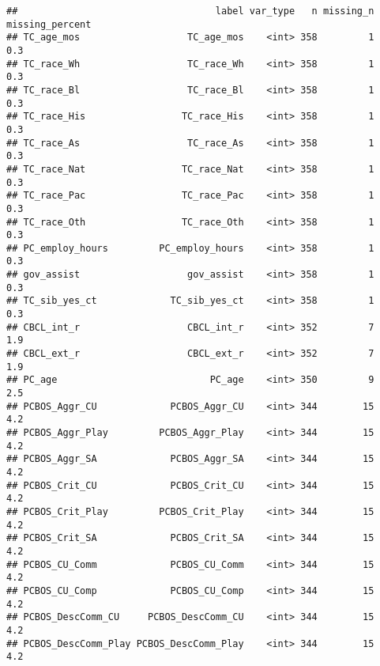 \documentclass[
]{article}
\newenvironment{Shaded}{\begin{snugshade}}{\end{snugshade}}
\newcommand{\FunctionTok}[1]{\textcolor[rgb]{0.00,0.00,0.00}{#1}}
\newcommand{\NormalTok}[1]{#1}
\newcommand{\OtherTok}[1]{\textcolor[rgb]{0.56,0.35,0.01}{#1}}
\newcommand{\SpecialCharTok}[1]{\textcolor[rgb]{0.00,0.00,0.00}{#1}}
\begin{document}
\begin{Shaded}
\end{Shaded}

\begin{verbatim}
##                                   label var_type   n missing_n missing_percent
## TC_age_mos                   TC_age_mos    <int> 358         1             0.3
## TC_race_Wh                   TC_race_Wh    <int> 358         1             0.3
## TC_race_Bl                   TC_race_Bl    <int> 358         1             0.3
## TC_race_His                 TC_race_His    <int> 358         1             0.3
## TC_race_As                   TC_race_As    <int> 358         1             0.3
## TC_race_Nat                 TC_race_Nat    <int> 358         1             0.3
## TC_race_Pac                 TC_race_Pac    <int> 358         1             0.3
## TC_race_Oth                 TC_race_Oth    <int> 358         1             0.3
## PC_employ_hours         PC_employ_hours    <int> 358         1             0.3
## gov_assist                   gov_assist    <int> 358         1             0.3
## TC_sib_yes_ct             TC_sib_yes_ct    <int> 358         1             0.3
## CBCL_int_r                   CBCL_int_r    <int> 352         7             1.9
## CBCL_ext_r                   CBCL_ext_r    <int> 352         7             1.9
## PC_age                           PC_age    <int> 350         9             2.5
## PCBOS_Aggr_CU             PCBOS_Aggr_CU    <int> 344        15             4.2
## PCBOS_Aggr_Play         PCBOS_Aggr_Play    <int> 344        15             4.2
## PCBOS_Aggr_SA             PCBOS_Aggr_SA    <int> 344        15             4.2
## PCBOS_Crit_CU             PCBOS_Crit_CU    <int> 344        15             4.2
## PCBOS_Crit_Play         PCBOS_Crit_Play    <int> 344        15             4.2
## PCBOS_Crit_SA             PCBOS_Crit_SA    <int> 344        15             4.2
## PCBOS_CU_Comm             PCBOS_CU_Comm    <int> 344        15             4.2
## PCBOS_CU_Comp             PCBOS_CU_Comp    <int> 344        15             4.2
## PCBOS_DescComm_CU     PCBOS_DescComm_CU    <int> 344        15             4.2
## PCBOS_DescComm_Play PCBOS_DescComm_Play    <int> 344        15             4.2

\end{verbatim}
\end{document}
